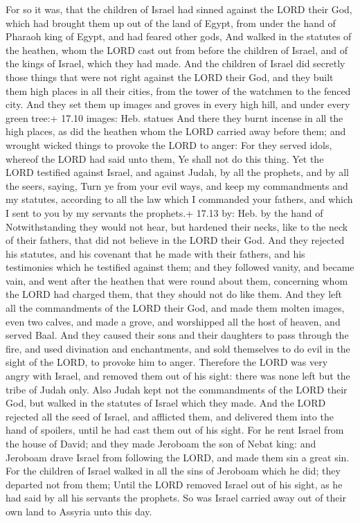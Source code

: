  For so it was, that the children of Israel had sinned
against the LORD their God, which had brought them up out of the land of
Egypt, from under the hand of Pharaoh king of Egypt, and had feared
other gods,  And walked in the statutes of the heathen, whom
the LORD cast out from before the children of Israel, and of the kings
of Israel, which they had made.  And the children of Israel
did secretly those things that were not right against the LORD their
God, and they built them high places in all their cities, from the tower
of the watchmen to the fenced city.  And they set them up
images and groves in every high hill, and under every green tree:+ 17.10
images: Heb. statues  And there they burnt incense in all
the high places, as did the heathen whom the LORD carried away before
them; and wrought wicked things to provoke the LORD to anger:
 For they served idols, whereof the LORD had said unto
them, Ye shall not do this thing.  Yet the LORD testified
against Israel, and against Judah, by all the prophets, and by all the
seers, saying, Turn ye from your evil ways, and keep my commandments and
my statutes, according to all the law which I commanded your fathers,
and which I sent to you by my servants the prophets.+ 17.13 by: Heb. by
the hand of  Notwithstanding they would not hear, but
hardened their necks, like to the neck of their fathers, that did not
believe in the LORD their God.  And they rejected his
statutes, and his covenant that he made with their fathers, and his
testimonies which he testified against them; and they followed vanity,
and became vain, and went after the heathen that were round about them,
concerning whom the LORD had charged them, that they should not do like
them.  And they left all the commandments of the LORD their
God, and made them molten images, even two calves, and made a grove, and
worshipped all the host of heaven, and served Baal.  And
they caused their sons and their daughters to pass through the fire, and
used divination and enchantments, and sold themselves to do evil in the
sight of the LORD, to provoke him to anger.  Therefore the
LORD was very angry with Israel, and removed them out of his sight:
there was none left but the tribe of Judah only.  Also
Judah kept not the commandments of the LORD their God, but walked in the
statutes of Israel which they made.  And the LORD rejected
all the seed of Israel, and afflicted them, and delivered them into the
hand of spoilers, until he had cast them out of his sight. 
For he rent Israel from the house of David; and they made Jeroboam the
son of Nebat king: and Jeroboam drave Israel from following the LORD,
and made them sin a great sin.  For the children of Israel
walked in all the sins of Jeroboam which he did; they departed not from
them;  Until the LORD removed Israel out of his sight, as
he had said by all his servants the prophets. So was Israel carried away
out of their own land to Assyria unto this day.

